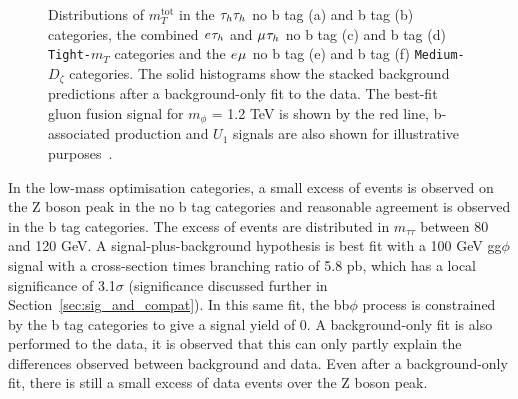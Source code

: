 \begin{figure}[p!]
\caption[Plots of the $m_{T}^\text{tot}$ distributions in the high-mass optimisation categories.]{Distributions of $m_{T}^\text{tot}$ in the $\tau_{h}\tau_{h}$ no b tag (a) and b tag (b) categories, the combined $e_{}\tau_{h}$ and $\mu_{}\tau_{h}$ no b tag (c) and b tag (d) \texttt{Tight-$m_{T}$} categories and the $e_{}\mu_{}$ no b tag (e) and b tag (f) \texttt{Medium-$D_{\zeta}$} categories. The solid histograms show the stacked background predictions after a background-only fit to the data. The best-fit gluon fusion signal for $m_{\phi}$ = 1.2 TeV is shown by the red line, b-associated production and $U_{1}$ signals are also shown for illustrative purposes~\cite{CMS:2022rbd}.}
\label{fig:high_mass_postfit}
\end{figure}

In the low-mass optimisation categories, a small excess of events is observed on the Z boson peak in the no b tag categories and reasonable agreement is observed in the b tag categories.
The excess of events are distributed in $m_{\tau\tau}$ between 80 and 120 GeV.
A signal-plus-background hypothesis is best fit with a 100 GeV gg$\phi$ signal with a cross-section times branching ratio of 5.8 pb, which has a local significance of 3.1$\sigma$ (significance discussed further in Section~\ref{sec:sig_and_compat}). 
In this same fit, the bb$\phi$ process is constrained by the b tag categories to give a signal yield of 0.
A background-only fit is also performed to the data, it is observed that this can only partly explain the differences observed between background and data.
Even after a background-only fit, there is still a small excess of data events over the Z boson peak. \\

